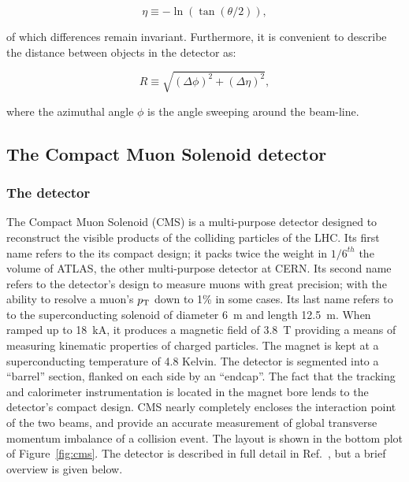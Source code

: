 \begin{equation}
        \eta \equiv −\ln\left( \tan\left(\theta/2\right)\right),
        \label{pseudo}      
\end{equation}

of which differences remain invariant. Furthermore, it is convenient to describe the distance between
objects in the detector as:

\begin{equation}
        R \equiv \sqrt{\left(\Delta\phi\right)^2 + \left(\Delta\eta\right)^2},
        \label{pseudo}      
\end{equation}

where the azimuthal angle $\phi$ is the angle sweeping around the beam-line.

\subsection{The Compact Muon Solenoid detector\label{sec:cms}}

\subsubsection{The detector}
The Compact Muon Solenoid (CMS) is a multi-purpose detector designed to reconstruct
the visible products of the colliding particles of the LHC. Its first name refers to 
the its compact design; it packs twice the weight in $1/6^{th}$ the volume of ATLAS, 
the other multi-purpose detector at CERN. Its second name refers to the detector's design
to measure muons with great precision; with the ability to resolve a muon's $p_{\mathrm{T}}$ down to 
1\% in some cases. Its last name refers to to the superconducting solenoid of diameter 
6~m and length 12.5~m. When ramped up to 18~kA, it produces a magnetic field of 3.8~T providing
a means of measuring kinematic properties of charged particles. The magnet is kept at a 
superconducting temperature of 4.8 Kelvin. The detector is segmented into a ``barrel'' 
section, flanked on each side by an ``endcap''. The fact that the tracking and calorimeter 
instrumentation is located in the magnet bore lends to the detector's compact design. 
CMS nearly completely encloses the interaction point of the two beams, and provide an 
accurate measurement of global transverse momentum imbalance of a collision event. The 
layout is shown in the bottom plot of Figure~\ref{fig:cms}. The detector is described in 
full detail in Ref.~\cite{1748-0221-3-08-S08004,Bayatian:922757,Bayatian:942733}, but a brief
overview is given below. 

